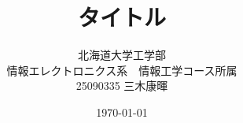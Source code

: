 \documentclass[12pt]{jarticle}
\begin{document}
\title{タイトル}
\author{北海道大学工学部\\
情報エレクトロニクス系　情報工学コース所属\\
25090335 三木康暉}
\date{\today}
\maketitle

\clearpage
\end{document}
